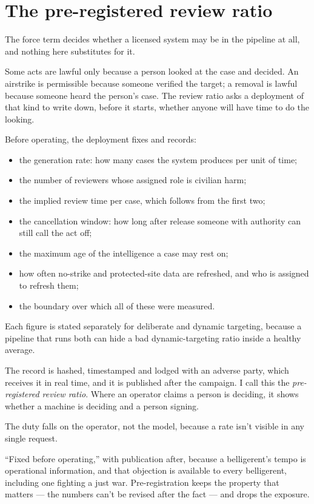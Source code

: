 \section{The pre-registered review ratio}
\label{sec:7.1}
The force term decides whether a licensed system may be in the pipeline at all, and nothing here substitutes for it.

Some acts are lawful only because a person looked at the case and decided. An airstrike is permissible because someone verified the target; a removal is lawful because someone heard the person's case. The review ratio asks a deployment of that kind to write down, before it starts, whether anyone will have time to do the looking.

Before operating, the deployment fixes and records:

\begin{itemize}
\item the generation rate: how many cases the system produces per unit of time;
\item the number of reviewers whose assigned role is civilian harm;
\item the implied review time per case, which follows from the first two;
\item the cancellation window: how long after release someone with authority can still call the act off;
\item the maximum age of the intelligence a case may rest on;
\item how often no-strike and protected-site data are refreshed, and who is assigned to refresh them;
\item the boundary over which all of these were measured.
\end{itemize}

Each figure is stated separately for deliberate and dynamic targeting, because a pipeline that runs both can hide a bad dynamic-targeting ratio inside a healthy average.

The record is hashed, timestamped and lodged with an adverse party, which receives it in real time, and it is published after the campaign. I call this the \emph{pre-registered review ratio}. Where an operator claims a person is deciding, it shows whether a machine is deciding and a person signing.

The duty falls on the operator, not the model, because a rate isn't visible in any single request.

“Fixed before operating,” with publication after, because a belligerent's tempo is operational information, and that objection is available to every belligerent, including one fighting a just war. Pre-registration keeps the property that matters — the numbers can't be revised after the fact — and drops the exposure.

